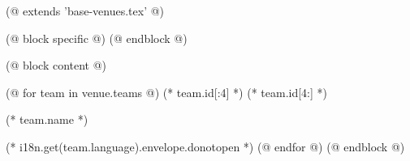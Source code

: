 (@ extends 'base-venues.tex' @)

(@ block specific @)
    \geometry{paper=c5paper, landscape}
(@ endblock @)

(@ block content @)
    \pagestyle{empty}
    \centering

    (@ for team in venue.teams @)
        \vspace*{10mm}
        \fontsize{80}{0}\selectfont%
        (* team.id[:4] *)%
        \fontsize{120}{0}\selectfont%
        (* team.id[4:] *)%

        \vspace{10mm}
        \fontsize{15}{0}\selectfont
        (* team.name *)

        \vspace{30mm}
        \normalsize
        (* i18n.get(team.language).envelope.donotopen *)
        \newpage
    (@ endfor @)
(@ endblock @)
